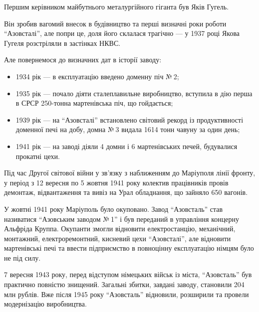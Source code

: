 
Першим керівником майбутнього металургійного гіганта був Яків Гугель.

Він зробив вагомий внесок в будівництво та перші визначні роки роботи
\enquote{Азовсталі}, але попри це, доля його склалася трагічно — у 1937 році Якова
Гугеля розстріляли в застінках НКВС.

Але повернемося до визначних дат в історії заводу:

\begin{itemize} %
\item 1934 рік — в експлуатацію введено доменну піч № 2;

\item 1935 рік — почало діяти сталеплавильне виробництво, вступила в дію перша в
СРСР 250-тонна мартенівська піч, що гойдається;

\item 1939 рік — на \enquote{Азовсталі} встановлено світовий рекорд із продуктивності
доменної печі на добу, домна № 3 видала 1614 тонн чавуну за один день;

\item 1941 рік — на заводі діяли 4 домни і 6 мартенівських печей, будувалися
прокатні цехи.
\end{itemize} %


Під час Другої світової війни у зв'язку з наближенням до Маріуполя лінії
фронту, у період з 12 вересня по 5 жовтня 1941 року колектив працівників провів
демонтаж, відвантаження та вивіз на Урал обладнання, що зайняло 650 вагонів.

У жовтні 1941 року Маріуполь було окуповано. Завод \enquote{Азовсталь} став називатися
\enquote{Азовським заводом № 1} і був переданий в управління концерну Альфріда Круппа.
Окупанти змогли відновити електростанцію, механічний, монтажний,
електроремонтний, кисневий цехи \enquote{Азовсталі}, але відновити мартенівські печі та
ввести підприємство в повноцінну експлуатацію німцям було не під силу.

7 вересня 1943 року, перед відступом німецьких військ із міста, \enquote{Азовсталь} був
практично повністю знищений. Загальні збитки, завдані заводу, становили 204 млн
рублів. Вже після 1945 року \enquote{Азовсталь} відновили, розширили та провели
модернізацію виробництва.

